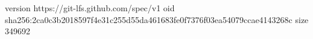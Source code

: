 version https://git-lfs.github.com/spec/v1
oid sha256:2ca0c3b2018597f4e31c255d55da461683fe0f7376f03ea54079ccae4143268c
size 349692

